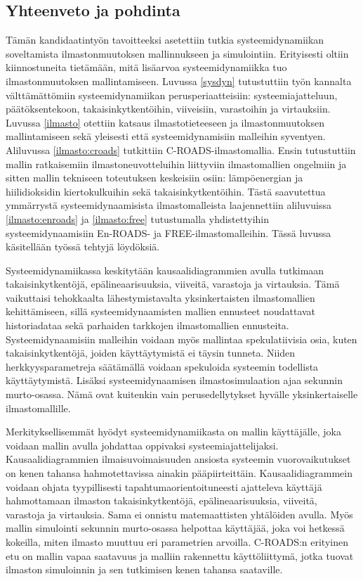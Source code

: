 \documentclass[finnish,12pt,a4paper,pdftex]{article}
\begin{document}
\begin{onehalfspacing}
\clearpage

\section{Yhteenveto ja pohdinta \label{yhteenveto}}

Tämän kandidaatintyön tavoitteeksi asetettiin tutkia systeemidynamiikan soveltamista ilmastonmuutoksen mallinnukseen ja simulointiin. Erityisesti oltiin kiinnostuneita tietämään, mitä lisäarvoa systeemidynamiikka tuo ilmastonmuutoksen mallintamiseen. Luvussa \ref{sysdyn} tutustuttiin työn kannalta välttämättömiin systeemidynamiikan perusperiaatteisiin: systeemiajatteluun, päätöksentekoon, takaisinkytkentöihin, viiveisiin, varastoihin ja virtauksiin. Luvussa \ref{ilmasto} otettiin katsaus ilmastotieteeseen ja ilmastonmuutoksen mallintamiseen sekä yleisesti että systeemidynamisiin malleihin syventyen. Aliluvussa \ref{ilmasto:croads} tutkittiin C-ROADS-ilmastomallia. Ensin tutustuttiin mallin ratkaisemiin ilmastoneuvotteluihin liittyviin ilmastomallien ongelmiin ja sitten mallin tekniseen toteutuksen keskeisiin osiin: lämpöenergian ja hiilidioksidin kiertokulkuihin sekä takaisinkytkentöihin. Tästä saavutettua ymmärrystä systeemidynaamisista ilmastomalleista laajennettiin aliluvuissa \ref{ilmasto:enroads} ja \ref{ilmasto:free} tutustumalla yhdistettyihin systeemidynaamisiin En-ROADS- ja FREE-ilmastomalleihin. Tässä luvussa käsitellään työssä tehtyjä löydöksiä. 

Systeemidynamiikassa keskitytään kausaalidiagrammien avulla tutkimaan takaisinkytkentöjä, epälineaarisuuksia, viiveitä, varastoja ja virtauksia. Tämä vaikuttaisi tehokkaalta lähestymistavalta yksinkertaisten ilmastomallien kehittämiseen, sillä systeemidynaamisten mallien ennusteet noudattavat historiadataa sekä parhaiden tarkkojen ilmastomallien ennusteita. Systeemidynaamisiin malleihin voidaan myös mallintaa spekulatiivisia osia, kuten takaisinkytkentöjä, joiden käyttäytymistä ei täysin tunneta. Niiden herkkyysparametreja säätämällä voidaan spekuloida systeemin todellista käyttäytymistä. Lisäksi systeemidynaamisen ilmastosimulaation ajaa sekunnin murto-osassa. Nämä ovat kuitenkin vain perusedellytykset hyvälle yksinkertaiselle ilmastomallille. 

Merkityksellisemmät hyödyt systeemidynamiikasta on mallin käyttäjälle, joka voidaan mallin avulla johdattaa oppivaksi systeemiajattelijaksi. Kausaalidiagrammien ilmaisuvoimaisuuden ansiosta systeemin vuorovaikutukset on kenen tahansa hahmotettavissa ainakin pääpiirteittäin. Kausaalidiagrammein voidaan ohjata tyypillisesti tapahtumaorientoituneesti ajatteleva käyttäjä hahmottamaan ilmaston takaisinkytkentöjä, epälineaarisuuksia, viiveitä, varastoja ja virtauksia. Sama ei onnistu matemaattisten yhtälöiden avulla. Myös mallin simulointi sekunnin murto-osassa helpottaa käyttäjää, joka voi hetkessä kokeilla, miten ilmasto muuttuu eri parametrien arvoilla. C-ROADS:n erityinen etu on mallin vapaa saatavuus ja malliin rakennettu käyttöliittymä, jotka tuovat ilmaston simuloinnin ja sen tutkimisen kenen tahansa saataville. 


\end{onehalfspacing}
\end{document}
